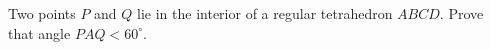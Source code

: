 Two points $ P$ and $ Q$ lie in the interior of a regular tetrahedron $ ABCD$. Prove that angle $ PAQ < 60^\circ$.
